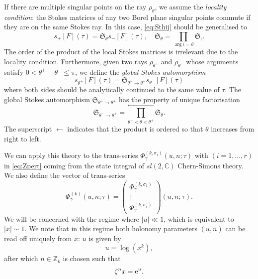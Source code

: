 \documentclass[a4paper,11pt]{article}	%
\def\mf{\mathfrak}
\def\IC{\mathbb{C}}
\def\IZ{\mathbb{Z}}
\newcommand{\re}{{\rm e}}
\newcommand{\s}{\sigma}
\begin{document}
If there are multiple singular points on the ray $\rho_{\theta}$, we
assume the \emph{locality condition}: the Stokes matrices of any two
Borel plane singular points commute if they are on the same Stokes
ray.  In this case, \eqref{eq:Sthij} should be generalised to
\begin{equation}
  s_+[F](\tau) = \mf{S}_\theta s_-[F](\tau),\quad
  \mf{S}_\theta = \prod_{\arg\iota=\theta} \mf{S}_\iota.
\end{equation}
The order of the product of the local Stokes matrices is irrelevant
due to the locality condition.  Furthermore, given two rays
$\rho_{\theta^+}$ and $\rho_{\theta^-}$ whose arguments satisfy
$0<\theta^+-\theta^- \leq \pi$, we define the \emph{global Stokes
  automorphism}
\begin{equation}
  s_{\theta^+}[F](\tau) = \mf{S}_{\theta^-\rightarrow \theta^+} s_{\theta^-}[F](\tau)
\end{equation}
where both sides should be analytically continued to the same value of
$\tau$.  The global Stokes automorphism
$\mf{S}_{\theta^-\rightarrow \theta^+}$ has the property of unique
factorisation
\begin{equation}
  \mf{S}_{\theta^-\rightarrow \theta^+} =
  \prod_{\theta^-<\theta<\theta^+}^{\leftarrow}
  \mf{S}_\theta.
  \label{eq:Sfac}
\end{equation}
The superscript $\leftarrow$ indicates that the product is ordered so
that $\theta$ increases from right to left.  

%


We can apply this theory to the trans-series
$\Phi_\gamma^{(k,\s_i)}(u,n;\tau)$ with $(i=1,\ldots,r)$ in
\eqref{eq:Zpert} coming from the state integral of $sl(2,\IC)$ Chern-Simons theory.
We also define the vector of trans-series
\begin{equation}
  \Phi_\gamma^{(k)}(u,n;\tau) =
  \begin{pmatrix}
    \Phi_\gamma^{(k,\s_1)}\\
    \vdots\\
    \Phi_\gamma^{(k,\s_r)}
  \end{pmatrix}(u,n;\tau).
  \label{eq:Zkgamma}
\end{equation}
We will be concerned with the regime where $|u|\ll 1$, which is
equivalent to $|x| \sim 1$.  We note that in this regime both holonomy
parameters $(u,n)$ can be read off uniquely from $x$: $u$ is given by
\begin{equation}
  u = \log(x^k),
\end{equation}
after which $n\in\IZ_k$ is chosen such that
\begin{equation}
  \zeta^n x = \re^u.
\end{equation}
\end{document}
